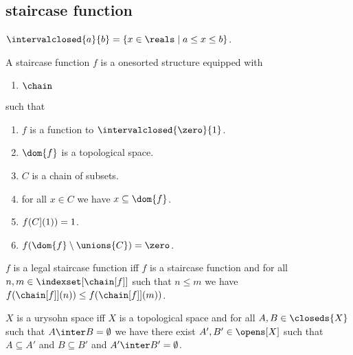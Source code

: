 \subsection{staircase function}

\begin{definition}\label{intervalclosed}
    $\intervalclosed{a}{b} = \{x \in \reals \mid a \leq x \leq b\}$.
\end{definition}


\begin{struct}\label{staircase_function}
    A staircase function $f$ is a onesorted structure equipped with
    \begin{enumerate}
        \item $\chain$
    \end{enumerate}
    such that
    \begin{enumerate}
        \item \label{staircase_is_function} $f$ is a function to $\intervalclosed{\zero}{1}$.
        \item \label{staircase_domain} $\dom{f}$ is a topological space.
        \item \label{staricase_def_chain} $C$ is a chain of subsets.
        \item \label{staircase_chain_is_in_domain} for all $x \in C$ we have $x \subseteq \dom{f}$.
        \item \label{staircase_behavoir_index_zero} $f(\index[C](1))= 1$. 
        \item \label{staircase_behavoir_index_n} $f(\dom{f}\setminus \unions{C}) = \zero$.
    \end{enumerate}
\end{struct}

\begin{definition}\label{legal_staircase}
    $f$ is a legal staircase function iff
    $f$ is a staircase function and 
    for all $n,m \in \indexset[\chain[f]]$ such that $n \leq m$ we have $f(\index[\chain[f]](n)) \leq f(\index[\chain[f]](m))$.
\end{definition}

\begin{abbreviation}\label{urysohnspace}
    $X$ is a urysohn space iff
    $X$ is a topological space and
    for all $A,B \in \closeds{X}$ such that $A \inter B = \emptyset$
    we have there exist $A',B' \in \opens[X]$
    such that  $A \subseteq A'$ and $B \subseteq B'$ and $A' \inter B' = \emptyset$.    
\end{abbreviation}


